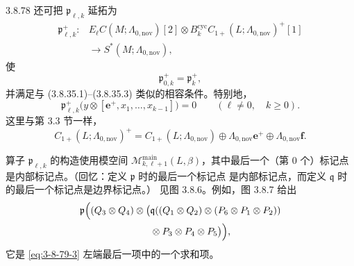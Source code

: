 \begin{proposition}{3.8.78}
还可把 $\mathfrak p_{\ell,k}$ 延拓为
\[
\begin{aligned}
 \mathfrak p^+_{\ell,k}\colon{}&
 E_\ell C(M;\Lambda_{0,\mathrm{nov}})[2]
 \otimes
 B_k^{\mathrm{cyc}}C_{1+}(L;\Lambda_{0,\mathrm{nov}})^+[1]\\
 &\longrightarrow S^*(M;\Lambda_{0,\mathrm{nov}}),
\end{aligned}
\]
使
\begin{equation}
 \mathfrak p^+_{0,k}=\mathfrak p^+_k,
\tag{3.8.79.5}\label{eq:3-8-79-5}
\end{equation}
并满足与 (3.8.35.1)--(3.8.35.3) 类似的相容条件。特别地，
\begin{equation}
 \mathfrak p^+_{\ell,k}
 \bigl(y\otimes[\mathbf e^+,x_1,\ldots,x_{k-1}]\bigr)=0
 \qquad(\ell\ne0,\quad k\geq0).
\tag{3.8.79.6}\label{eq:3-8-79-6}
\end{equation}
这里与第 3.3 节一样，
\[
 C_{1+}(L;\Lambda_{0,\mathrm{nov}})^+
 =C_{1+}(L;\Lambda_{0,\mathrm{nov}})
 \oplus\Lambda_{0,\mathrm{nov}}\mathbf e^+
 \oplus\Lambda_{0,\mathrm{nov}}\mathbf f.
\]
\end{proposition}

算子 $\mathfrak p_{\ell,k}$ 的构造使用模空间
$\mathcal M_{k,\ell+1}^{\mathrm{main}}(L,\beta)$，其中最后一个（第 $0$
个）标记点是内部标记点。（回忆：定义 $\mathfrak p$ 时的最后一个标记点
是内部标记点，而定义 $\mathfrak q$ 时的最后一个标记点是边界标记点。）
见图 3.8.6。例如，图 3.8.7 给出
\[
\begin{aligned}
 \mathfrak p\Bigl(
 (Q_3\otimes Q_4)\otimes
 \bigl(&\mathfrak q(
 (Q_1\otimes Q_2)\otimes(P_6\otimes P_1\otimes P_2))\\
 &\otimes P_3\otimes P_4\otimes P_5
 \bigr)
 \Bigr),
\end{aligned}
\]
它是 \eqref{eq:3-8-79-3} 左端最后一项中的一个求和项。

